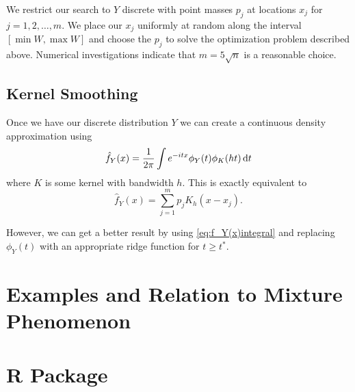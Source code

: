 		We restrict our search to $Y$ discrete with point masses $p_j$ at locations $x_j$ for $j = 1,2,\dots,m$. We place our $x_j$ uniformly at random along the interval $[\min W, \max W]$ and choose the $p_j$ to solve the optimization problem described above. Numerical investigations indicate that $m = 5 \sqrt{n}$ is a reasonable choice.

	\subsection{Kernel Smoothing}
		\label{ssec:KernelSmoothing}
		Once we have our discrete distribution $Y$ we can create a continuous density approximation using
		\begin{equation}
		\hat{f}_Y(x) = \frac{1}{2\pi} \int e^{-itx} \phi_Y(t) \phi_K(ht)  \, \mathrm{d} t
		\label{eq:f_Y(x)integral}
		\end{equation}
		where $K$ is some kernel with bandwidth $h$. This is exactly equivalent to
		\begin{equation}
		\hat{f}_Y(x) = \sum_{j=1}^m p_j K_h(x - x_j).
		\label{eq:f_Y(x)sum}
		\end{equation}

		However, we can get a better result by using \eqref{eq:f_Y(x)integral} and replacing $\phi_Y(t)$ with an appropriate ridge function for $t \geq t^*$.

\section{Examples and Relation to Mixture Phenomenon}

\section{R Package}